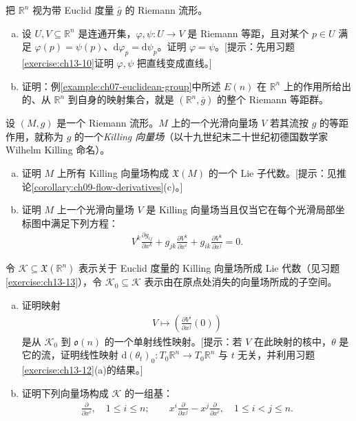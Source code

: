 \documentclass[../../main.tex]{subfiles}
\begin{document}
\begin{exercise}\label{exercise:ch13-12}
把 $\mathbb{R}^n$ 视为带 Euclid 度量 $\bar g$ 的 Riemann 流形。
\begin{enumerate}[(a)]
\item 设 $U,V\subseteq\mathbb{R}^n$ 是连通开集，$\varphi,\psi:U\to V$ 是 Riemann 等距，且对某个 $p\in U$ 满足 $\varphi(p)=\psi(p)$、$\mathrm{d}\varphi_p=\mathrm{d}\psi_p$。证明 $\varphi=\psi$。[提示：先用习题\ref{exercise:ch13-10}证明 $\varphi,\psi$ 把直线变成直线。]
\item 证明：例\ref{example:ch07-euclidean-group}中所述 $E(n)$ 在 $\mathbb{R}^n$ 上的作用所给出的、从 $\mathbb{R}^n$ 到自身的映射集合，就是 $(\mathbb{R}^n,\bar g)$ 的整个 Riemann 等距群。
\end{enumerate}
\end{exercise}

\begin{exercise}\label{exercise:ch13-13}
设 $(M,g)$ 是一个 Riemann 流形。$M$ 上的一个光滑向量场 $V$ 若其流按 $g$ 的等距作用，就称为 $g$ 的一个\emph{Killing 向量场}（以十九世纪末二十世纪初德国数学家 Wilhelm Killing 命名）。
\begin{enumerate}[(a)]
\item 证明 $M$ 上所有 Killing 向量场构成 $\mathfrak X(M)$ 的一个 Lie 子代数。[提示：见推论\ref{corollary:ch09-flow-derivatives}(c)。]
\item 证明 $M$ 上一个光滑向量场 $V$ 是 Killing 向量场当且仅当它在每个光滑局部坐标图中满足下列方程：
\begin{align*}
V^k\frac{\partial g_{ij}}{\partial x^k}+g_{jk}\frac{\partial V^k}{\partial x^i}+g_{ik}\frac{\partial V^k}{\partial x^j}=0.
\end{align*}
\end{enumerate}
\end{exercise}

\begin{exercise}\label{exercise:ch13-14}
令 $\mathcal K\subseteq\mathfrak X(\mathbb{R}^n)$ 表示关于 Euclid 度量的 Killing 向量场所成 Lie 代数（见习题\ref{exercise:ch13-13}），令 $\mathcal K_0\subseteq\mathcal K$ 表示由在原点处消失的向量场所成的子空间。
\begin{enumerate}[(a)]
\item 证明映射
\begin{align*}
V\mapsto\left(\frac{\partial V^i}{\partial x^j}(0)\right)
\end{align*}
是从 $\mathcal K_0$ 到 $\mathfrak o(n)$ 的一个单射线性映射。[提示：若 $V$ 在此映射的核中，$\theta$ 是它的流，证明线性映射 $\mathrm{d}(\theta_t)_0:T_0\mathbb{R}^n\to T_0\mathbb{R}^n$ 与 $t$ 无关，并利用习题\ref{exercise:ch13-12}(a)的结果。]
\item 证明下列向量场构成 $\mathcal K$ 的一组基：
\begin{align*}
\frac{\partial}{\partial x^i},\quad 1\leqslant i\leqslant n;\qquad
x^i\frac{\partial}{\partial x^j}-x^j\frac{\partial}{\partial x^i},\quad 1\leqslant i<j\leqslant n.
\end{align*}
\end{enumerate}
\end{exercise}
\end{document}
